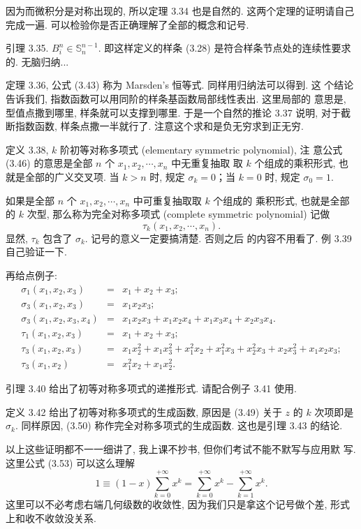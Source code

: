 \documentclass[a4paper]{ctexart}
\begin{document}
因为而微积分是对称出现的, 所以定理 3.34 也是自然的. 这两个定理的证明请自己
完成一遍. 可以检验你是否正确理解了全部的概念和记号.

引理 3.35. $B_i^n \in \mathbb{S}_n^{n - 1}$. 即这样定义的样条 (3.28)
是符合样条节点处的连续性要求的. 无脑归纳...

定理 3.36, 公式 (3.43) 称为 Marsden's 恒等式. 同样用归纳法可以得到. 这
个结论告诉我们, 指数函数可以用同阶的样条基函数局部线性表出. 这里局部的
意思是, 型值点撒到哪里, 样条就可以支撑到哪里. 于是一个自然的推论 3.37
说明, 对于截断指数函数, 样条点撒一半就行了. 注意这个求和是负无穷求到正无穷.

定义 3.38, $k$ 阶初等对称多项式 (elementary symmetric polynomial), 注
意公式(3.46) 的意思是全部 $n$ 个 $x_1, x_2, \cdots, x_n$ 中无重复抽取
取 $k$ 个组成的乘积形式, 也就是全部的广义交叉项. 当 $k > n$ 时,
规定 $\sigma_k = 0$；当 $k = 0$ 时, 规定 $\sigma_0 = 1$.

如果是全部 $n$ 个 $x_1, x_2, \cdots, x_n$ 中可重复抽取取 $k$ 个组成的
乘积形式, 也就是全部的 $k$ 次型, 那么称为完全对称多项式 (complete
symmetric polynomial) 记做
$$
\tau_k(x_1, x_2, \cdots, x_n).
$$
显然, $\tau_k$ 包含了 $\sigma_k$. 记号的意义一定要搞清楚. 否则之后
的内容不用看了. 例 3.39 自己验证一下.

再给点例子:
$$
\begin{array}{rcl}
  \sigma_1(x_1, x_2, x_3) &=& x_1 + x_2 + x_3; \\
  \sigma_3(x_1, x_2, x_3) &=& x_1x_2x_3; \\
  \sigma_3(x_1, x_2, x_3, x_4) &=& x_1x_2x_3 + x_1x_2x_4 + x_1x_3x_4 + x_2x_3x_4.\\
  \tau_1(x_1, x_2, x_3) &=& x_1 + x_2 + x_3;\\
  \tau_3(x_1, x_2, x_3) &=& x_1x_2^2 + x_1x_3^2 + x_1^2x_2 + x_1^2x_3 + x_2^2x_3 + x_2x_3^2 + x_1x_2x_3;\\
  \tau_3(x_1, x_2) &=& x_1^2x_2 + x_1x_2^2.
\end{array}
$$

引理 3.40 给出了初等对称多项式的递推形式. 请配合例子 3.41 使用.

定义 3.42 给出了初等对称多项式的生成函数, 原因是 (3.49) 关于 $z$ 的
$k$ 次项即是 $\sigma_k$. 同样原因, (3.50) 称作完全对称多项式的生成函数.
这也是引理 3.43 的结论.

以上这些证明都不一一细讲了, 我上课不抄书, 但你们考试不能不默写与应用默
写. 这里公式 (3.53) 可以这么理解
$$
1 \equiv (1 - x)\sum_{k = 0}^{+\infty} x^k = \sum_{k =
  0}^{+\infty}x^k - \sum_{k = 1}^{+\infty} x^k.
$$
这里可以不必考虑右端几何级数的收敛性, 因为我们只是拿这个记号做个差,
形式上和收不收敛没关系.
\end{document}
